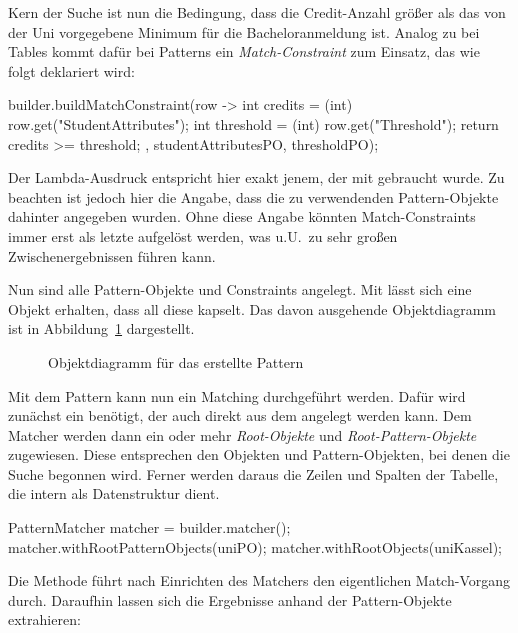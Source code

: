 Kern der Suche ist nun die Bedingung, dass die Credit-Anzahl größer als das von der Uni vorgegebene Minimum für die Bacheloranmeldung ist.
Analog zu  bei Tables kommt dafür bei Patterns ein \emph{Match-Constraint} zum Einsatz,
das wie folgt deklariert wird:

\begin{jcodeblock}
    builder.buildMatchConstraint(row -> {
        int credits = (int) row.get("StudentAttributes");
        int threshold = (int) row.get("Threshold");
        return credits >= threshold;
    }, studentAttributesPO, thresholdPO);
\end{jcodeblock}

Der Lambda-Ausdruck entspricht hier exakt jenem, der mit  gebraucht wurde.
Zu beachten ist jedoch hier die Angabe, dass die zu verwendenden Pattern-Objekte dahinter angegeben wurden.
Ohne diese Angabe könnten Match-Constraints immer erst als letzte aufgelöst werden,
was u.U.\ zu sehr großen Zwischenergebnissen führen kann.

Nun sind alle Pattern-Objekte und Constraints angelegt.
Mit  lässt sich eine Objekt erhalten, dass all diese kapselt.
Das davon ausgehende Objektdiagramm ist in Abbildung~\ref{fig:pattern-diagram} dargestellt.

\begin{figure}
    \caption{Objektdiagramm für das erstellte Pattern}
    \label{fig:pattern-diagram}
\end{figure}

Mit dem Pattern kann nun ein Matching durchgeführt werden.
Dafür wird zunächst ein  benötigt, der auch direkt aus dem  angelegt werden kann.
Dem Matcher werden dann ein oder mehr \emph{Root-Objekte} und \emph{Root-Pattern-Objekte} zugewiesen.
Diese entsprechen den Objekten und Pattern-Objekten, bei denen die Suche begonnen wird.
Ferner werden daraus die Zeilen und Spalten der Tabelle, die intern als Datenstruktur dient.

\begin{jcodeblock}
    PatternMatcher matcher = builder.matcher();
    matcher.withRootPatternObjects(uniPO);
    matcher.withRootObjects(uniKassel);
\end{jcodeblock}

Die Methode  führt nach Einrichten des Matchers den eigentlichen Match-Vorgang durch.
Daraufhin lassen sich die Ergebnisse anhand der Pattern-Objekte extrahieren:

